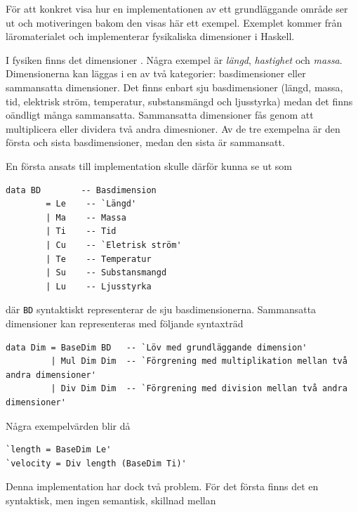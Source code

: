 \begin{draft}
För att konkret visa hur en implementationen av ett grundläggande område ser ut
och motiveringen bakom den visas här ett exempel. Exemplet kommer från
läromaterialet och implementerar fysikaliska dimensioner i Haskell.

I fysiken finns det dimensioner \cite{dimensioner_ne}. Några exempel är \textit{längd},
\textit{hastighet} och \textit{massa}. Dimensionerna kan läggas i en av två
kategorier: basdimensioner eller sammansatta dimensioner. Det finns enbart sju 
basdimensioner (längd, massa, tid, elektrisk ström, temperatur, substansmängd och
ljusstyrka) medan det finns oändligt många sammansatta. Sammansatta
dimensioner fås genom att multiplicera eller dividera två andra dimesnioner. Av
de tre exempelna är den första och sista basdimensioner, medan den sista är
sammansatt.

En första ansats till implementation skulle därför kunna se ut som

\begin{lstlisting}[frame=none, belowskip=-0.5\baselineskip, xleftmargin=0.5in]
 data BD        -- Basdimension
        = Le    -- `Längd'
        | Ma    -- Massa
        | Ti    -- Tid
        | Cu    -- `Eletrisk ström'
        | Te    -- Temperatur
        | Su    -- Substansmangd
        | Lu    -- Ljusstyrka
\end{lstlisting}

där \texttt{BD} syntaktiskt representerar de sju basdimensionerna.
Sammansatta dimensioner kan representeras med följande syntaxträd

\begin{lstlisting}[frame=none, belowskip=-0.5\baselineskip, xleftmargin=0.5in]
data Dim = BaseDim BD   -- `Löv med grundläggande dimension'
         | Mul Dim Dim  -- `Förgrening med multiplikation mellan två andra dimensioner'
         | Div Dim Dim  -- `Förgrening med division mellan två andra dimensioner'
\end{lstlisting}

Några exempelvärden blir då

\begin{lstlisting}[frame=none, belowskip=-0.5\baselineskip, xleftmargin=0.5in]
`length = BaseDim Le'
`velocity = Div length (BaseDim Ti)'
\end{lstlisting}

Denna implementation har dock två problem. För det första finns det en
syntaktisk, men ingen semantisk, skillnad mellan


\end{draft}
